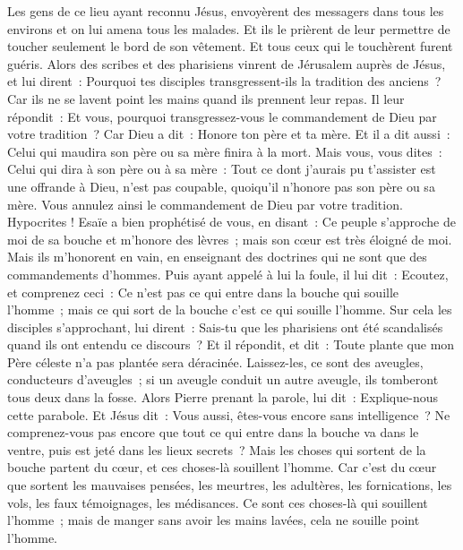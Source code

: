 \begin{multicols}{2}
Les gens de ce lieu ayant reconnu Jésus, envoyèrent des messagers dans tous les environs et on lui amena tous les malades.
Et ils le prièrent de leur permettre de toucher seulement le bord de son vêtement. Et tous ceux qui le touchèrent furent guéris.
\VerseOne{}Alors des scribes et des pharisiens vinrent de Jérusalem auprès de Jésus, et lui dirent~:
Pourquoi tes disciples transgressent-ils la tradition des anciens~? Car ils ne se lavent point les mains quand ils prennent leur repas.
Il leur répondit~: Et vous, pourquoi transgressez-vous le commandement de Dieu par votre tradition~?
Car Dieu a dit~: Honore ton père et ta mère. Et il a dit aussi~: Celui qui maudira son père ou sa mère finira à la mort.
Mais vous, vous dites~: Celui qui dira à son père ou à sa mère~: Tout ce dont j'aurais pu t'assister est une offrande à Dieu, n'est pas coupable, quoiqu'il n'honore pas son père ou sa mère.
Vous annulez ainsi le commandement de Dieu par votre tradition.
Hypocrites ! Esaïe a bien prophétisé de vous, en disant~:
Ce peuple s'approche de moi de sa bouche et m'honore des lèvres~; mais son cœur est très éloigné de moi.
Mais ils m'honorent en vain, en enseignant des doctrines qui ne sont que des commandements d'hommes.
Puis ayant appelé à lui la foule, il lui dit~: Ecoutez, et comprenez ceci~:
Ce n'est pas ce qui entre dans la bouche qui souille l'homme~; mais ce qui sort de la bouche c'est ce qui souille l'homme.
Sur cela les disciples s'approchant, lui dirent~: Sais-tu que les pharisiens ont été scandalisés quand ils ont entendu ce discours~?
Et il répondit, et dit~: Toute plante que mon Père céleste n'a pas plantée sera déracinée.
Laissez-les, ce sont des aveugles, conducteurs d'aveugles~; si un aveugle conduit un autre aveugle, ils tomberont tous deux dans la fosse.
Alors Pierre prenant la parole, lui dit~: Explique-nous cette parabole.
Et Jésus dit~: Vous aussi, êtes-vous encore sans intelligence~?
Ne comprenez-vous pas encore que tout ce qui entre dans la bouche va dans le ventre, puis est jeté dans les lieux secrets~?
Mais les choses qui sortent de la bouche partent du cœur, et ces choses-là souillent l'homme.
Car c'est du cœur que sortent les mauvaises pensées, les meurtres, les adultères, les fornications, les vols, les faux témoignages, les médisances.
Ce sont ces choses-là qui souillent l'homme~; mais de manger sans avoir les mains lavées, cela ne souille point l'homme.

\end{multicols}
